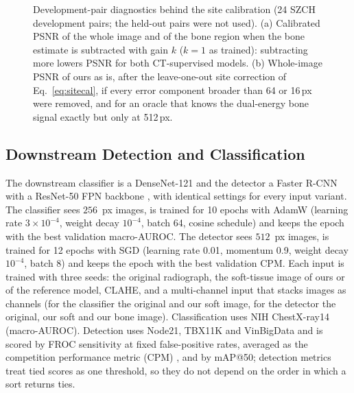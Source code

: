 \begin{figure}[!t]
\centering
{}
\caption{Development-pair diagnostics behind the site calibration (24 SZCH development pairs; the held-out pairs were not used). (a)
Calibrated PSNR of the whole image and of the bone region when the bone estimate is subtracted with gain $k$ ($k=1$ as trained):
subtracting more lowers PSNR for both CT-supervised models. (b) Whole-image PSNR of ours as is, after the leave-one-out site correction of
Eq.~\eqref{eq:sitecal}, if every error component broader than 64 or 16\,px were removed, and for an oracle that knows the dual-energy bone
signal exactly but only at 512\,px.}
\label{fig:sitecal_diag}
\end{figure}

\subsection{Downstream Detection and Classification}
\label{sec:m-downstream}
The downstream classifier is a DenseNet-121 \cite{huang2017densenet} and the detector a Faster R-CNN with a ResNet-50 FPN backbone
\cite{ren2017fasterrcnn}, with identical settings for every input variant. The classifier sees $256$~px images, is trained for 10 epochs
with AdamW \cite{loshchilov2019adamw} (learning rate $3\times10^{-4}$, weight decay $10^{-4}$, batch 64, cosine schedule) and keeps the
epoch with the best validation macro-AUROC. The detector sees $512$~px images, is trained for 12 epochs with SGD (learning rate 0.01,
momentum 0.9, weight decay $10^{-4}$, batch 8) and keeps the epoch with the best validation CPM. Each input is trained with three seeds:
the original radiograph, the soft-tissue image of ours or of the reference model, CLAHE, and a multi-channel input that stacks images as
channels (for the classifier the original and our soft image, for the detector the original, our soft and our bone image).
Classification uses NIH ChestX-ray14 (macro-AUROC). Detection uses Node21, TBX11K and VinBigData and is scored by FROC sensitivity at fixed false-positive rates, averaged as
the competition performance metric (CPM) \cite{vanginneken2010anode09,niemeijer2011cpm}, and by mAP@50; detection metrics treat tied scores
as one threshold, so they do not depend on the order in which a sort returns ties.

